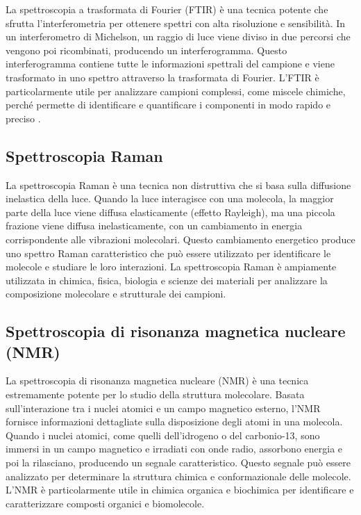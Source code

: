 \documentclass[12pt,a4paper]{report}
\begin{document}
La spettroscopia a trasformata di Fourier (FTIR) è una tecnica potente che sfrutta l'interferometria per ottenere spettri con alta risoluzione e sensibilità. In un interferometro di Michelson, un raggio di luce viene diviso in due percorsi che vengono poi ricombinati, producendo un interferogramma. Questo interferogramma contiene tutte le informazioni spettrali del campione e viene trasformato in uno spettro attraverso la trasformata di Fourier. L'FTIR è particolarmente utile per analizzare campioni complessi, come miscele chimiche, perché permette di identificare e quantificare i componenti in modo rapido e preciso \cite{griffiths2007fourier}.

\subsection{Spettroscopia Raman}

La spettroscopia Raman è una tecnica non distruttiva che si basa sulla diffusione inelastica della luce. Quando la luce interagisce con una molecola, la maggior parte della luce viene diffusa elasticamente (effetto Rayleigh), ma una piccola frazione viene diffusa inelasticamente, con un cambiamento in energia corrispondente alle vibrazioni molecolari. Questo cambiamento energetico produce uno spettro Raman caratteristico che può essere utilizzato per identificare le molecole e studiare le loro interazioni. La spettroscopia Raman è ampiamente utilizzata in chimica, fisica, biologia e scienze dei materiali per analizzare la composizione molecolare e strutturale dei campioni.

\subsection{Spettroscopia di risonanza magnetica nucleare (NMR)}

La spettroscopia di risonanza magnetica nucleare (NMR) è una tecnica estremamente potente per lo studio della struttura molecolare. Basata sull'interazione tra i nuclei atomici e un campo magnetico esterno, l'NMR fornisce informazioni dettagliate sulla disposizione degli atomi in una molecola. Quando i nuclei atomici, come quelli dell'idrogeno o del carbonio-13, sono immersi in un campo magnetico e irradiati con onde radio, assorbono energia e poi la rilasciano, producendo un segnale caratteristico. Questo segnale può essere analizzato per determinare la struttura chimica e conformazionale delle molecole. L'NMR è particolarmente utile in chimica organica e biochimica per identificare e caratterizzare composti organici e biomolecole.
\end{document}
